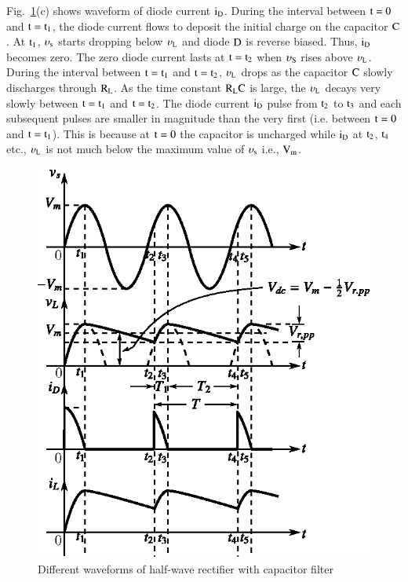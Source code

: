 Fig.~\ref{fig1.38}(c) shows waveform of diode current $\textrm{i}_{\textrm{D}}$. During the interval between $\textrm{t}=0$ and $\textrm{t}=\textrm{t}_{1}$, the diode current flows to deposit the initial charge on the capacitor $\textrm{C}$. At $\textrm{t}_{1}$, $\upsilon_{\textrm{s}}$ starts dropping below $\upsilon_{\textrm{L}}$ and diode $\textrm{D}$ is reverse biased. Thus, $\textrm{i}_{\textrm{D}}$ becomes zero. The zero diode current lasts at $\textrm{t}=\textrm{t}_{2}$ when $\upsilon_{\textrm{S}}$ rises above $\upsilon_{\textrm{L}}$. During the interval between $\textrm{t}=\textrm{t}_{1}$ and $\textrm{t}=\textrm{t}_{2}$, $\upsilon_{\textrm{L}}$ drops as the capacitor $\textrm{C}$ slowly discharges through $\textrm{R}_{\textrm{L}}$. As the time constant $\textrm{R}_{\textrm{L}}\textrm{C}$ is large, the $\upsilon_{\textrm{L}}$ decays very slowly between $\textrm{t}=\textrm{t}_{1}$ and $\textrm{t}=\textrm{t}_{2}$. The diode current $\textrm{i}_{\textrm{D}}$ pulse from $\textrm{t}_{2}$ to $\textrm{t}_{3}$ and each subsequent pulses are smaller in magnitude than the very first (i.e. between $\textrm{t}=0$ and $\textrm{t}=\textrm{t}_{1}$). This is because at $\textrm{t}=0$ the capacitor is uncharged while $\textrm{i}_{\textrm{D}}$ at $\textrm{t}_{2}$, $\textrm{t}_{4}$ etc., $\upsilon_{\textrm{L}}$ is not much below the maximum value of $\upsilon_{\textrm{s}}$ i.e., $\textrm{V}_{\textrm{m}}$.
\begin{figure}[H]
\centering
\includegraphics{chap1/fig1.38.eps}
\caption{Different waveforms of half-wave rectifier with capacitor filter}\label{fig1.38}
\end{figure}

